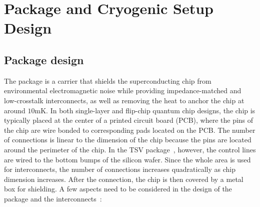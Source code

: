 \documentclass[a4paper,onecolumn,11pt,unpublished]{quantumarticle}
\begin{document}
\section{Package and Cryogenic Setup Design}
\subsection{Package design}
The package is a carrier that shields the superconducting chip from environmental electromagnetic noise while providing impedance-matched and low-crosstalk interconnects, as well as removing the heat to anchor the chip at around $10\mathrm{mK}$. 
In both single-layer and flip-chip quantum chip designs, the chip is typically placed at the center of a printed circuit board (PCB), where the pins of the chip are wire bonded to corresponding pads located on the PCB.
The number of connections is linear to the dimension of the chip because the pins are located around the perimeter of the chip. In the TSV package~\cite{Rosenberg2020TSV, Tamate2022ScalablePackaging}, however, the control lines are wired to the bottom bumps of the silicon wafer. Since the whole area is used for interconnects, the number of connections increases quadratically as chip dimension increases. After the connection, the chip is then covered by a metal box for shielding.
A few aspects need to be considered in the design of the package and the interconnects~\cite{Huang2021Package}: 
\end{document}
